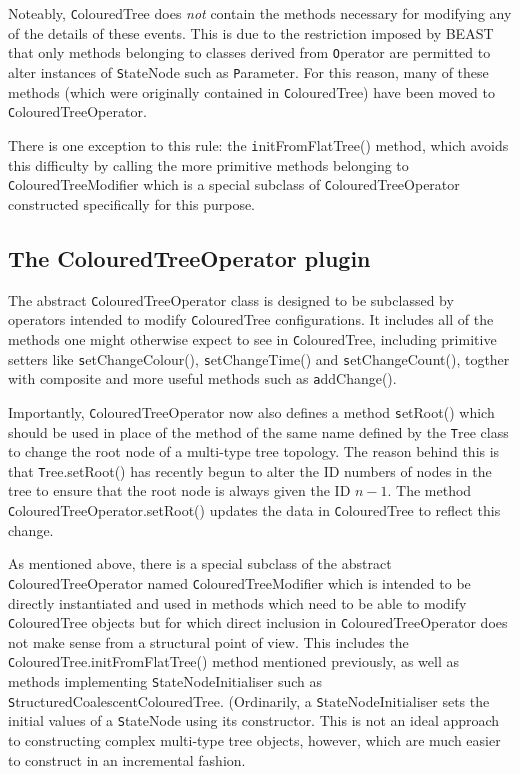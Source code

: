 \documentclass[english]{article}
\newcommand{\class}[1]{{\texttt #1}}
\newcommand{\method}[1]{{\texttt #1}}
\begin{document}
Noteably, \class{ColouredTree} does \emph{not} contain the methods
necessary for modifying any of the details of these events.  This is
due to the restriction imposed by BEAST that only methods belonging to
classes derived from \class{Operator} are permitted to alter instances
of \class{StateNode} such as \class{Parameter}.  For this reason,
many of these methods (which were originally contained in
\class{ColouredTree}) have been moved to \class{ColouredTreeOperator}.

There is one exception to this rule: the \method{initFromFlatTree()}
method, which avoids this difficulty by calling the more primitive
methods belonging to \class{ColouredTreeModifier} which is a special
subclass of \class{ColouredTreeOperator} constructed specifically for
this purpose.

\subsection{The ColouredTreeOperator plugin}

The abstract \class{ColouredTreeOperator} class is designed to be
subclassed by operators intended to modify \class{ColouredTree}
configurations.  It includes all of the methods one might otherwise
expect to see in \class{ColouredTree}, including primitive setters
like \method{setChangeColour()}, \method{setChangeTime()} and
\method{setChangeCount()}, togther with composite and more useful
methods such as \method{addChange()}.

Importantly, \class{ColouredTreeOperator} now also defines a method
\method{setRoot()} which should be used in place of the method of the
same name defined by the \class{Tree} class to change the root node of
a multi-type tree topology.  The reason behind this is that
\class{Tree.setRoot()} has recently begun to alter the ID numbers of
nodes in the tree to ensure that the root node is always given the ID
$n-1$.  The method \class{ColouredTreeOperator.setRoot()} updates the
data in \class{ColouredTree} to reflect this change.

As mentioned above, there is a special subclass of the abstract
\class{ColouredTreeOperator} named \class{ColouredTreeModifier} which
is intended to be directly instantiated and used in methods which need
to be able to modify \class{ColouredTree} objects but for which direct
inclusion in \class{ColouredTreeOperator} does not make sense from a
structural point of view.  This includes the
\class{ColouredTree.initFromFlatTree()} method mentioned previously,
as well as methods implementing \class{StateNodeInitialiser} such as
\class{StructuredCoalescentColouredTree}. (Ordinarily, a
\class{StateNodeInitialiser} sets the initial values of a
\class{StateNode} using its constructor.  This is not an ideal
approach to constructing complex multi-type tree objects, however,
which are much easier to construct in an incremental fashion.
\end{document}
